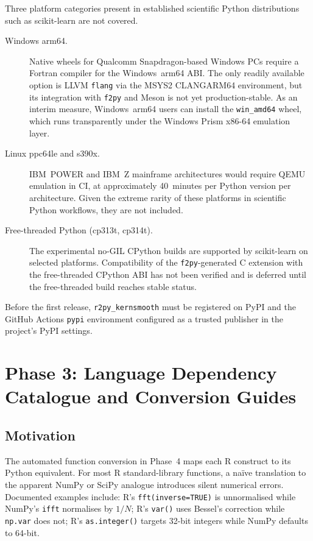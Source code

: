 \documentclass[12pt,a4paper]{article}
\begin{document}
Three platform categories present in established scientific Python distributions such as scikit-learn are not covered.

\begin{description}
  \item[Windows arm64.] Native wheels for Qualcomm Snapdragon-based Windows PCs require a Fortran compiler for the Windows~arm64 ABI. The only readily available option is LLVM \texttt{flang} via the MSYS2 CLANGARM64 environment, but its integration with \texttt{f2py} and Meson is not yet production-stable. As an interim measure, Windows~arm64 users can install the \texttt{win\_amd64} wheel, which runs transparently under the Windows Prism x86-64 emulation layer.

  \item[Linux ppc64le and s390x.] IBM~POWER and IBM~Z mainframe architectures would require QEMU emulation in CI, at approximately 40~minutes per Python version per architecture. Given the extreme rarity of these platforms in scientific Python workflows, they are not included.

  \item[Free-threaded Python (cp313t, cp314t).] The experimental no-GIL CPython builds are supported by scikit-learn on selected platforms. Compatibility of the \texttt{f2py}-generated C extension with the free-threaded CPython ABI has not been verified and is deferred until the free-threaded build reaches stable status.
\end{description}

Before the first release, \texttt{r2py\_kernsmooth} must be registered on PyPI and the GitHub Actions \texttt{pypi} environment configured as a trusted publisher in the project's PyPI settings.

\section{Phase 3: Language Dependency Catalogue and Conversion Guides}

\subsection{Motivation}

The automated function conversion in Phase~4 maps each R construct to its Python equivalent. For most R standard-library functions, a na\"{i}ve translation to the apparent NumPy or SciPy analogue introduces silent numerical errors. Documented examples include: R's \texttt{fft(inverse=TRUE)} is unnormalised while NumPy's \texttt{ifft} normalises by $1/N$; R's \texttt{var()} uses Bessel's correction while \texttt{np.var} does not; R's \texttt{as.integer()} targets 32-bit integers while NumPy defaults to 64-bit.
\end{document}

